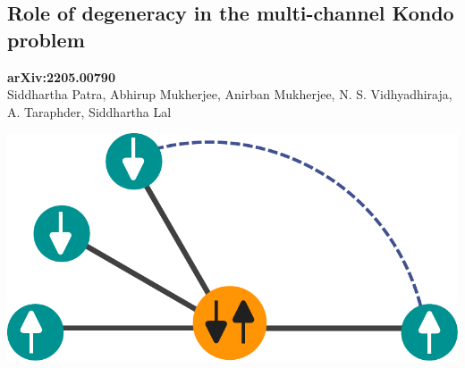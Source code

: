 \documentclass[9pt,aspectratio=169]{beamer}
\begin{document}
\begin{frame}{}
\section{Role of degeneracy in the multi-channel Kondo problem}
\begin{minipage}{0.55\textwidth}
	\small{{\bf arXiv:2205.00790}\\[10pt]
Siddhartha Patra, \alert{Abhirup Mukherjee}, Anirban Mukherjee, N. S. Vidhyadhiraja, A. Taraphder, Siddhartha Lal}
\end{minipage}
\hspace*{\fill}
\begin{minipage}{0.4\textwidth}
	\includegraphics[width=\textwidth]{stargraph.pdf}
\end{minipage}
\end{frame}
\end{document}
